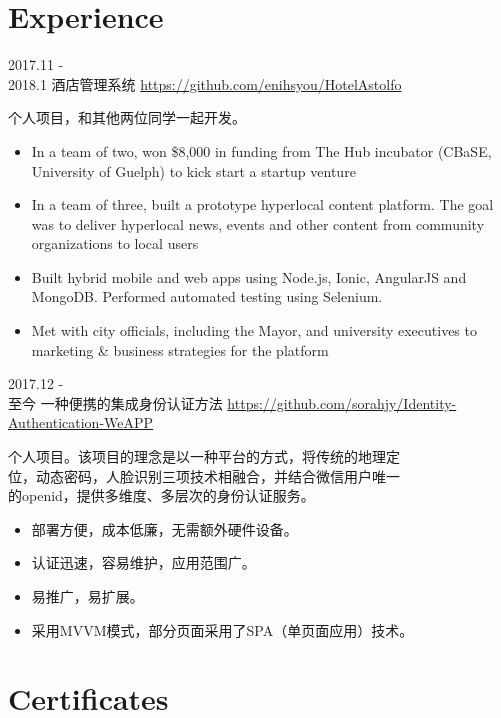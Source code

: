 \documentclass[letterpaper,UTF8]{twentysecondcv} %
\begin{document}


\section{Experience}

\begin{twenty} %
	\twentyitem
    	{2017.11 - \\2018.1}
        {酒店管理系统}
        {}
        {\href{https://github.com/sorahjy/HotelAstolfo}{https://github.com/enihsyou/HotelAstolfo}}
        {个人项目，和其他两位同学一起开发。
        {\begin{itemize}
        \item In a team of two, won \$8,000 in funding from The Hub incubator (CBaSE, University of Guelph) to kick start a startup venture
        \item In a team of three, built a prototype hyperlocal content platform. The goal was to deliver hyperlocal news, events and other content from community organizations to local users
        \item Built hybrid mobile and web apps using Node.js, Ionic, AngularJS and MongoDB. Performed automated testing using Selenium.
        \item Met with city officials, including the Mayor, and university executives to marketing \& business strategies for the platform 
    \end{itemize}}
        }
        
    \twentyitem
   		{2017.12 - \\ 至今}
        {一种便携的集成身份认证方法}
        {}
        { \href{https://github.com/sorahjy/Identity-Authentication-WeAPP}{https://github.com/sorahjy/Identity-Authentication-WeAPP}}
        {个人项目。该项目的理念是以一种平台的方式，将传统的地理定\\
        位，动态密码，人脸识别三项技术相融合，并结合微信用户唯一\\
        的openid，提供多维度、多层次的身份认证服务。
        {\begin{itemize}
        \item 部署方便，成本低廉，无需额外硬件设备。
        \item 认证迅速，容易维护，应用范围广。
        \item 易推广，易扩展。
        \item 采用MVVM模式，部分页面采用了SPA（单页面应用）技术。
    \end{itemize}}
        }


\section{Certificates}

\end{twenty}
\end{document}
